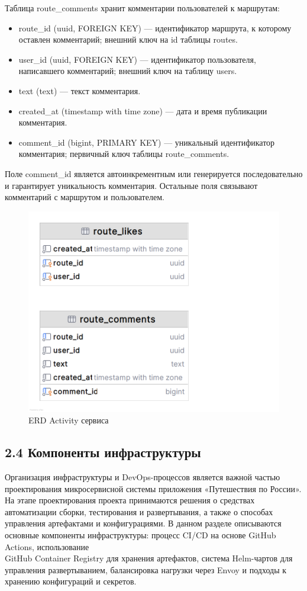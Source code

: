 Таблица route\_comments хранит комментарии пользователей к маршрутам:
\begin{itemize}
    \item route\_id (uuid, FOREIGN KEY) — идентификатор маршрута, к которому оставлен комментарий; внешний ключ на id таблицы routes.
    \item user\_id (uuid, FOREIGN KEY) — идентификатор пользователя, написавшего комментарий; внешний ключ на таблицу users.
    \item text (text) — текст комментария.
    \item created\_at (timestamp with time zone) — дата и время публикации комментария.
    \item comment\_id (bigint, PRIMARY KEY) — уникальный идентификатор комментария; первичный ключ таблицы route\_comments.
\end{itemize}
Поле comment\_id является автоинкрементным или генерируется последовательно и гарантирует уникальность комментария. Остальные поля связывают комментарий с маршрутом и пользователем.
\begin{figure}[H]
        \centering
        \includegraphics[width=0.8\linewidth]{Images/second_chapter_backend_architecture/Picture13.png}
        \caption{ERD Activity сервиса}
        \label{fig:activity-service-erd}
\end{figure}

\subsection*{2.4 Компоненты инфраструктуры}
Организация инфраструктуры и DevOps-процессов является важной частью проектирования микросервисной системы приложения «Путешествия по России». На этапе проектирования проекта принимаются решения о средствах автоматизации сборки, тестирования и развертывания, а также о способах управления артефактами и конфигурациями. В данном разделе описываются основные компоненты инфраструктуры: процесс CI/CD на основе GitHub Actions, использование \\ GitHub Container Registry для хранения артефактов, система Helm-чартов для управления развертыванием, балансировка нагрузки через Envoy и подходы к хранению конфигураций и секретов.

